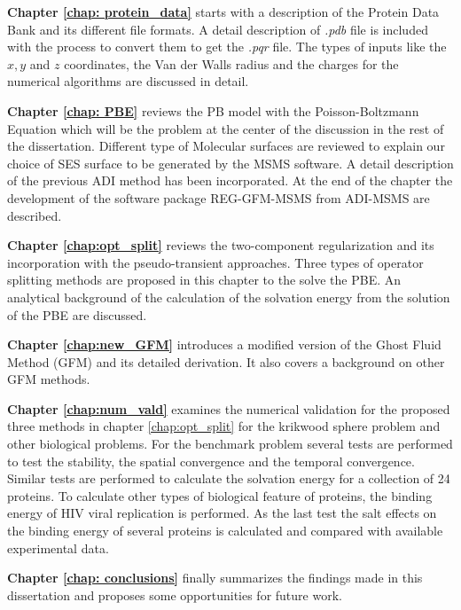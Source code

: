 {\bf Chapter \ref{chap: protein_data}} starts with a description of the Protein Data Bank and its different file formats. A detail description of {\it .pdb} file is included with the process to convert them to get the {\it .pqr} file. The types of inputs like the $x,y$ and $z$ coordinates, the Van der Walls radius and the charges for the numerical algorithms are discussed in detail. 

{\bf Chapter \ref{chap: PBE}} reviews the PB model with the Poisson-Boltzmann Equation which will be the problem at the center of the discussion in the rest of the dissertation. Different type of Molecular surfaces are reviewed to explain our choice of SES surface to be generated by the MSMS software. A detail description of the previous ADI method \cite{Geng2013_Fully} has been incorporated. At the end of the chapter the development of the software package REG-GFM-MSMS from ADI-MSMS are described. 

{\bf Chapter \ref{chap:opt_split}} reviews the two-component regularization and its incorporation with the pseudo-transient approaches. Three types of operator splitting methods are proposed in this chapter to the solve the PBE. An analytical background of the calculation of the solvation energy from the solution of the PBE are discussed.

{\bf Chapter \ref{chap:new_GFM}} introduces a modified version of the Ghost Fluid Method (GFM) and its detailed derivation. It also covers a background on other GFM methods.

{\bf Chapter \ref{chap:num_vald}} examines the numerical validation for the proposed three methods in chapter \ref{chap:opt_split} for the krikwood sphere problem and other biological problems. For the benchmark problem  several tests are performed to test the stability, the spatial convergence and the temporal convergence. Similar tests are performed to calculate the solvation energy for a collection of 24 proteins. To calculate other types of biological feature of proteins, the binding energy of HIV viral replication is performed. As the last test the salt effects on the binding energy of several proteins is calculated and compared with available experimental data.    

{\bf Chapter \ref{chap: conclusions}} finally summarizes the findings made in this dissertation and proposes some opportunities for future work.  